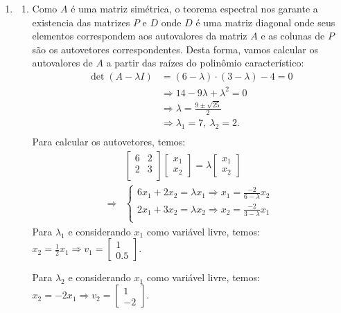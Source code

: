 \documentclass[a4paper,12pt]{article}
\begin{document}
\begin{enumerate}
    \item 
    \begin{enumerate}
        \item Como $A$ é uma matriz simétrica, o teorema espectral nos garante a existencia das matrizes $P$ e $D$ onde $D$ é uma matriz diagonal onde seus elementos correspondem aos autovalores da matriz $A$ e as colunas de $P$ são os autovetores correspondentes. Desta forma, vamos calcular os autovalores de $A$ a partir das raízes do polinômio característico:
    \begin{align*}
        \det(A - \lambda I) &= (6-\lambda) \cdot (3-\lambda) - 4 = 0\\
        &\Rightarrow 14 - 9\lambda + \lambda^2 = 0 \\
        &\Rightarrow \lambda = \frac{9 \pm \sqrt{25}}{2} \\
        &\Rightarrow \lambda_1 = 7,\ \lambda_2 = 2. \\
    \end{align*}
    Para calcular os autovetores, temos:
    \begin{align*}
    &\begin{bmatrix}
        6 & 2\\
        2 & 3\\
    \end{bmatrix} \begin{bmatrix}
        x_1\\x_2
    \end{bmatrix} = \lambda \begin{bmatrix}
        x_1\\x_2
    \end{bmatrix}\\
    \Rightarrow & \begin{cases}
        6 x_1 + 2 x_2 = \lambda x_1 \Rightarrow x_1 = \frac{-2 }{6-\lambda}x_2\\
        2 x_1 + 3 x_2 = \lambda x_2  \Rightarrow x_2 = \frac{-2 }{3-\lambda}x_1 \\
    \end{cases}
    \end{align*}
    Para $\lambda_1$ e considerando $x_1$ como variável livre, temos: $x_2 = \frac{1}{2}x_1 \Rightarrow v_1 = \begin{bmatrix}
        1 \\ 0.5
    \end{bmatrix}$.

    Para $\lambda_2$ e considerando $x_1$ como variável livre, temos: $x_2 = -2 x_1 \Rightarrow v_2 = \begin{bmatrix}
        1 \\ -2
    \end{bmatrix}$.
    

\end{enumerate}
\end{enumerate}
\end{document}
